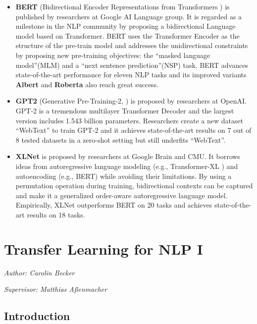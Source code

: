 \documentclass[]{krantz}
\begin{document}
\begin{itemize}
\item
  \textbf{BERT} (Bidirectional Encoder Representations from Transformers \citet{bert}) is published by researchers at Google AI Language group.
  It is regarded as a milestone in the NLP community by proposing a bidirectional Language model based on Transformer. BERT uses the Transformer Encoder as the structure of the pre-train model and addresses the unidirectional constraints by proposing new pre-training objectives: the ``masked language model''(MLM) and a ``next sentence prediction''(NSP) task. BERT advances state-of-the-art performance for eleven NLP tasks and its improved variants \textbf{Albert} \citet{lan2019albert} and \textbf{Roberta} \citet{liu2019roberta} also reach great success.
\item
  \textbf{GPT2} (Generative Pre-Training-2, \citet{radford2019gpt2}) is proposed by researchers at OpenAI. GPT-2 is a tremendous multilayer Transformer Decoder and the largest version includes 1.543 billion parameters. Researchers create a new dataset ``WebText'' to train GPT-2 and it achieves state-of-the-art results on 7 out of 8 tested datasets in a zero-shot setting but still underfits ``WebText''.
\item
  \textbf{XLNet} is proposed by researchers at Google Brain and CMU\citep{yang2019xlnet}. It borrows ideas from autoregressive language modeling (e.g., Transformer-XL \citet{dai2019transformer}) and autoencoding (e.g., BERT) while avoiding their limitations. By using a permutation operation during training, bidirectional contexts can be captured and make it a generalized order-aware autoregressive language model. Empirically, XLNet outperforms BERT on 20 tasks and achieves state-of-the-art results on 18 tasks.
\end{itemize}

\hypertarget{transfer-learning-for-nlp-i}{%
\chapter{Transfer Learning for NLP I}\label{transfer-learning-for-nlp-i}}

\emph{Author: Carolin Becker}

\emph{Supervisor: Matthias Aßenmacher}

\hypertarget{introduction}{%
\section{Introduction}\label{introduction}}
\end{document}
